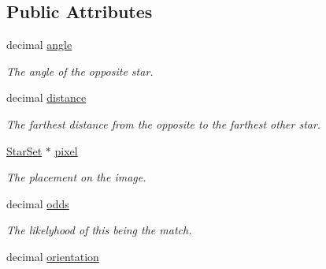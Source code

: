 \subsection*{Public Attributes}
\begin{DoxyCompactItemize}
\item 
\mbox{\label{classstar__tracker_1_1StarSet_af834c889627c1d36810ed570f869bcf8}} 
decimal \hyperlink{classstar__tracker_1_1StarSet_af834c889627c1d36810ed570f869bcf8}{angle}
\begin{DoxyCompactList}\small\item\em The angle of the opposite star. \end{DoxyCompactList}\item 
\mbox{\label{classstar__tracker_1_1StarSet_a2b84f55d3f02005e125ad72474a170af}} 
decimal \hyperlink{classstar__tracker_1_1StarSet_a2b84f55d3f02005e125ad72474a170af}{distance}
\begin{DoxyCompactList}\small\item\em The farthest distance from the opposite to the farthest other star. \end{DoxyCompactList}\item 
\mbox{\label{classstar__tracker_1_1StarSet_a329dbaa8e449841dafe8ca2ce98f0fc7}} 
\hyperlink{classstar__tracker_1_1StarSet}{Star\+Set} $\ast$ \hyperlink{classstar__tracker_1_1StarSet_a329dbaa8e449841dafe8ca2ce98f0fc7}{pixel}
\begin{DoxyCompactList}\small\item\em The placement on the image. \end{DoxyCompactList}\item 
\mbox{\label{classstar__tracker_1_1StarSet_abad08b6e63351948d61b8dd591c9f8f9}} 
decimal \hyperlink{classstar__tracker_1_1StarSet_abad08b6e63351948d61b8dd591c9f8f9}{odds}
\begin{DoxyCompactList}\small\item\em The likelyhood of this being the match. \end{DoxyCompactList}\item 
\mbox{\label{classstar__tracker_1_1StarSet_a6944b49e54603db35f6a3c50dba7ddb3}} 
decimal \hyperlink{classstar__tracker_1_1StarSet_a6944b49e54603db35f6a3c50dba7ddb3}{orientation}

\end{DoxyCompactItemize}
